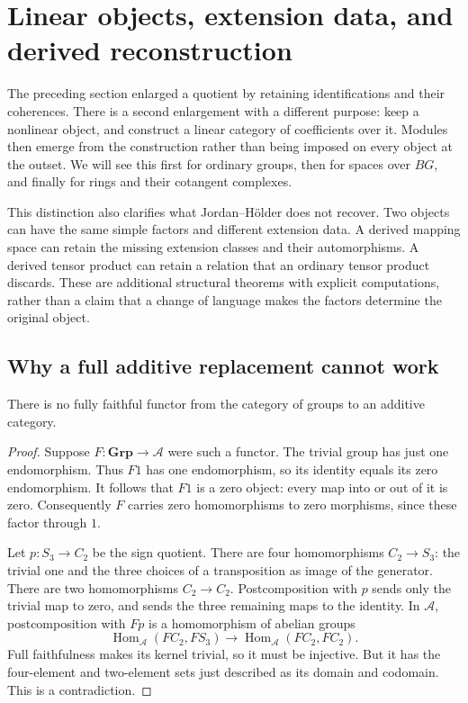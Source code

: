 \section{Linear objects, extension data, and derived reconstruction}
\label{t:chapter}

The preceding section enlarged a quotient by retaining identifications and
their coherences.  There is a second enlargement with a different purpose:
keep a nonlinear object, and construct a linear category of coefficients
over it.  Modules then emerge from the construction rather than being
imposed on every object at the outset.  We will see this first for ordinary
groups, then for spaces over $BG$, and finally for rings and their
cotangent complexes.

This distinction also clarifies what Jordan--H\"older does not recover.
Two objects can have the same simple factors and different extension
data.  A derived mapping space can retain the missing extension classes
and their automorphisms.  A derived tensor product can retain a relation
that an ordinary tensor product discards.  These are additional structural
theorems with explicit computations, rather than a claim that a change of
language makes the factors determine the original object.

\subsection{Why a full additive replacement cannot work}

\begin{proposition}\label{t:no-full-additive}
There is no fully faithful functor from the category of groups to an
additive category.
\end{proposition}
\begin{proof}
Suppose $F:\mathbf{Grp}\to\mathcal A$ were such a functor.  The trivial
group has just one endomorphism.  Thus $F1$ has one endomorphism, so its
identity equals its zero endomorphism.  It follows that $F1$ is a zero
object: every map into or out of it is zero.  Consequently $F$ carries
zero homomorphisms to zero morphisms, since these factor through $1$.

Let $p:S_3\to C_2$ be the sign quotient.  There are four homomorphisms
$C_2\to S_3$: the trivial one and the three choices of a transposition
as image of the generator.  There are two homomorphisms $C_2\to C_2$.
Postcomposition with $p$ sends only the trivial map to zero, and sends
the three remaining maps to the identity.  In $\mathcal A$, postcomposition
with $Fp$ is a homomorphism of abelian groups
\[
 \operatorname{Hom}_{\mathcal A}(FC_2,FS_3)
 \longrightarrow \operatorname{Hom}_{\mathcal A}(FC_2,FC_2).
\]
Full faithfulness makes its kernel trivial, so it must be injective.  But
it has the four-element and two-element sets just described as its domain
and codomain.  This is a contradiction.
\end{proof}

